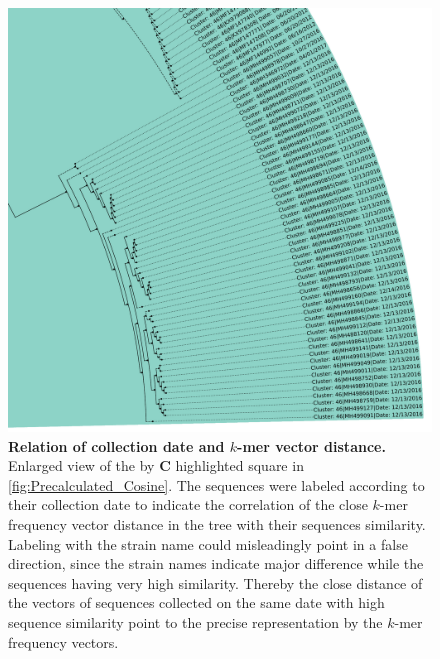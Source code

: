 \begin{figure}[!hbt]
    \centering
    \includegraphics[width=\textwidth]{Graphics/identical.pdf}
    \caption[Relation of collection date and $k$-mer vector distance]{\textbf{Relation of collection date and $k$-mer vector distance.} Enlarged view of the by \textbf{\textsf{C}} highlighted square in \autoref{fig:Precalculated_Cosine}. The sequences were labeled according to their collection date to indicate the correlation of the close $k$-mer frequency vector distance in the tree with their sequences similarity. Labeling with the strain name could misleadingly point in a false direction, since the strain names indicate major difference while the sequences having very high similarity. Thereby the close distance of the vectors of sequences collected on the same date with high sequence similarity point to the precise representation by the $k$-mer frequency vectors.}
    \label{fig:focus}
\end{figure}

\vspace{1em}

